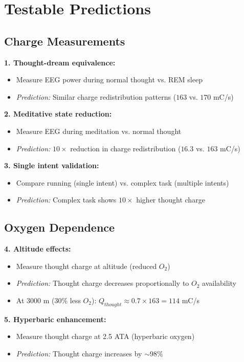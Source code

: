 \documentclass[12pt,a4paper]{article}
\begin{document}
\section{Testable Predictions}

\subsection{Charge Measurements}

\textbf{1. Thought-dream equivalence:}
\begin{itemize}
\item Measure EEG power during normal thought vs. REM sleep
\item \textit{Prediction:} Similar charge redistribution patterns ($163$ vs. $170$ mC/s)
\end{itemize}

\textbf{2. Meditative state reduction:}
\begin{itemize}
\item Measure EEG during meditation vs. normal thought
\item \textit{Prediction:} $10\times$ reduction in charge redistribution ($16.3$ vs. $163$ mC/s)
\end{itemize}

\textbf{3. Single intent validation:}
\begin{itemize}
\item Compare running (single intent) vs. complex task (multiple intents)
\item \textit{Prediction:} Complex task shows $10\times$ higher thought charge
\end{itemize}

\subsection{Oxygen Dependence}

\textbf{4. Altitude effects:}
\begin{itemize}
\item Measure thought charge at altitude (reduced $O_2$)
\item \textit{Prediction:} Thought charge decreases proportionally to $O_2$ availability
\item At 3000 m (30\% less $O_2$): $Q_{thought} \approx 0.7 \times 163 = 114$ mC/s
\end{itemize}

\textbf{5. Hyperbaric enhancement:}
\begin{itemize}
\item Measure thought charge at 2.5 ATA (hyperbaric oxygen)
\item \textit{Prediction:} Thought charge increases by $\sim 98\%$
\end{itemize}
\end{document}
